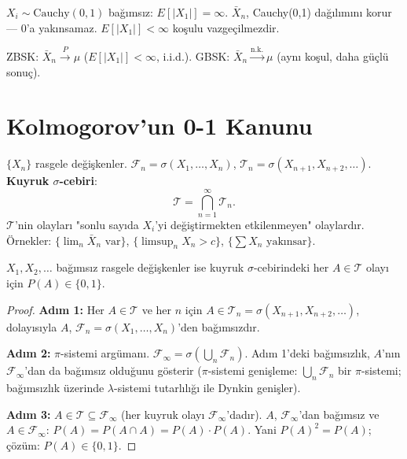 \begin{karsiornek}
$X_i \sim \mathrm{Cauchy}(0,1)$ bağımsız: $E[|X_1|] = \infty$.
$\bar{X}_n$, Cauchy(0,1) dağılımını korur --- $0$'a yakınsamaz.
$E[|X_1|] < \infty$ koşulu vazgeçilmezdir.
\end{karsiornek}

\begin{mikroozet}
ZBSK: $\bar{X}_n \xrightarrow{P} \mu$ ($E[|X_1|] < \infty$, i.i.d.).
GBSK: $\bar{X}_n \xrightarrow{\text{n.k.}} \mu$ (aynı koşul, daha güçlü sonuç).
\end{mikroozet}

\section{Kolmogorov'un 0-1 Kanunu}
\label{sec:01_kanunu}

\begin{tanim}
\label{def:kuyruk_sigma}
$\{X_n\}$ rasgele değişkenler. $\mathcal{F}_n = \sigma(X_1, \ldots, X_n)$,
$\mathcal{T}_n = \sigma(X_{n+1}, X_{n+2}, \ldots)$. \textbf{Kuyruk $\sigma$-cebiri}:
\[
  \mathcal{T} = \bigcap_{n=1}^\infty \mathcal{T}_n.
\]
$\mathcal{T}$'nin olayları "sonlu sayıda $X_i$'yi değiştirmekten etkilenmeyen" olaylardır.
Örnekler: $\{\lim_n \bar{X}_n \text{ var}\}$, $\{\limsup_n X_n > c\}$, $\{\sum X_n \text{ yakınsar}\}$.
\end{tanim}

\begin{teorem}
\label{thm:01_kanunu}
$X_1, X_2, \ldots$ bağımsız rasgele değişkenler ise kuyruk $\sigma$-cebirindeki
her $A \in \mathcal{T}$ olayı için $P(A) \in \{0, 1\}$.
\end{teorem}

\begin{proof}
\textbf{Adım 1:} Her $A \in \mathcal{T}$ ve her $n$ için $A \in \mathcal{T}_n = \sigma(X_{n+1}, X_{n+2}, \ldots)$,
dolayısıyla $A$, $\mathcal{F}_n = \sigma(X_1, \ldots, X_n)$'den bağımsızdır.

\textbf{Adım 2:} $\pi$-sistemi argümanı. $\mathcal{F}_\infty = \sigma(\bigcup_n \mathcal{F}_n)$.
Adım 1'deki bağımsızlık, $A$'nın $\mathcal{F}_\infty$'dan da bağımsız olduğunu gösterir
($\pi$-sistemi genişleme: $\bigcup_n \mathcal{F}_n$ bir $\pi$-sistemi; bağımsızlık üzerinde
$\lambda$-sistemi tutarlılığı ile Dynkin genişler).

\textbf{Adım 3:} $A \in \mathcal{T} \subseteq \mathcal{F}_\infty$ (her kuyruk olayı $\mathcal{F}_\infty$'dadır).
$A$, $\mathcal{F}_\infty$'dan bağımsız ve $A \in \mathcal{F}_\infty$:
$P(A) = P(A \cap A) = P(A) \cdot P(A)$.
Yani $P(A)^2 = P(A)$; çözüm: $P(A) \in \{0, 1\}$.
\end{proof}

